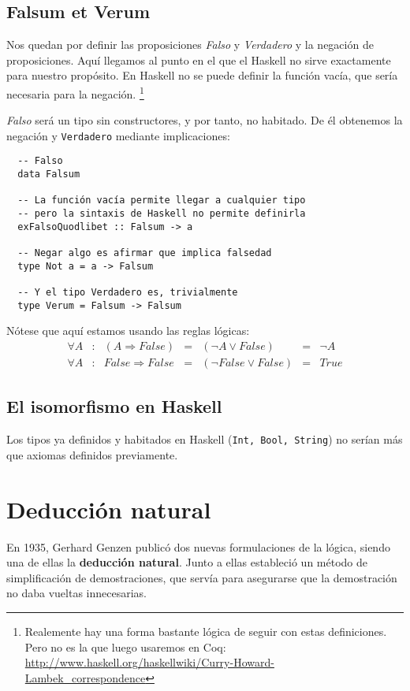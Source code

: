 \documentclass[paper=a4, fontsize=11pt, spanish]{scrartcl} %
\numberwithin{equation}{section} %
\numberwithin{figure}{section} %
\numberwithin{table}{section} %
\begin{document}
    \subsection{Falsum et Verum}
      Nos quedan por definir las proposiciones \textit{Falso} y \textit{Verdadero} y la
      negación de proposiciones. Aquí llegamos al punto en el que el Haskell no sirve exactamente
      para nuestro propósito. En Haskell no se puede definir la función vacía, que sería necesaria
      para la negación. \footnote{Realemente hay una forma bastante lógica de seguir con estas
      definiciones. Pero no es la que luego usaremos en Coq: 
      \url{http://www.haskell.org/haskellwiki/Curry-Howard-Lambek_correspondence}}
      
      \textit{Falso} será un tipo sin constructores, y por tanto, no habitado. De él obtenemos
      la negación y \texttt{Verdadero} mediante implicaciones:
      \begin{lstlisting}
  -- Falso
  data Falsum

  -- La función vacía permite llegar a cualquier tipo
  -- pero la sintaxis de Haskell no permite definirla
  exFalsoQuodlibet :: Falsum -> a

  -- Negar algo es afirmar que implica falsedad
  type Not a = a -> Falsum

  -- Y el tipo Verdadero es, trivialmente
  type Verum = Falsum -> Falsum
      \end{lstlisting}
      Nótese que aquí estamos usando las reglas lógicas:
      \begin{align*}
        \forall A&:& (A \Rightarrow False) &=& (\neg A \vee False) &=& \neg A \\
        \forall A&:& False \Rightarrow False &=& (\neg False \vee False) &=& True
      \end{align*}
      
    \subsection{El isomorfismo en Haskell}
      Los tipos ya definidos y habitados en Haskell (\texttt{Int, Bool, String}) no serían más que axiomas definidos
      previamente.
    
      
    
  \section{Deducción natural}
    En 1935, Gerhard Genzen publicó dos nuevas formulaciones de la lógica, siendo
    una de ellas la \textbf{deducción natural}. Junto a ellas estableció un método
    de simplificación de demostraciones, que servía para asegurarse que la demostración
    no daba vueltas innecesarias.
    
\end{document}
